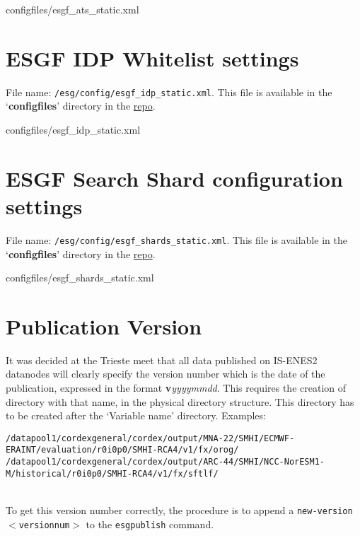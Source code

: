 \begin{tiny}
\begin{verbatimtabinput}[4]{configfiles/esgf_ats_static.xml}
\end{verbatimtabinput}
\end{tiny}
\section{ESGF IDP Whitelist settings}
File name: \texttt{/esg/config/esgf\_idp\_static.xml}. This file is available in the `\textbf{configfiles}' directory in the \href{https://github.com/snic-nsc/datanode-mgr-doc.git}{repo}.
\begin{tiny}
\begin{verbatimtabinput}[4]{configfiles/esgf_idp_static.xml}
\end{verbatimtabinput}
\end{tiny}
\section{ESGF Search Shard configuration settings}
File name: \texttt{/esg/config/esgf\_shards\_static.xml}. This file is available in the `\textbf{configfiles}' directory in the \href{https://github.com/snic-nsc/datanode-mgr-doc.git}{repo}.

\begin{tiny}
\begin{verbatimtabinput}[4]{configfiles/esgf_shards_static.xml}
\end{verbatimtabinput}
\end{tiny}

\section{Publication Version}
It was decided at the Trieste meet that all data published on IS-ENES2 datanodes will clearly specify the version number which is the date of the publication, expressed in the format \textbf{v}\textit{yyyymmdd}. This requires the creation of directory with that name, in the physical directory structure. This directory has to be created after the `Variable name' directory. Examples:\\
\begin{tiny}
\texttt{/datapool1/cordexgeneral/cordex/output/MNA-22/SMHI/ECMWF-ERAINT/evaluation/r0i0p0/SMHI-RCA4/v1/fx/orog/}\\
\texttt{/datapool1/cordexgeneral/cordex/output/ARC-44/SMHI/NCC-NorESM1-M/historical/r0i0p0/SMHI-RCA4/v1/fx/sftlf/}\\
\end{tiny}
\\To get this version number correctly, the procedure is to append a \texttt{\myopt new-version $<$versionnum$>$} to the \texttt{esgpublish} command.

